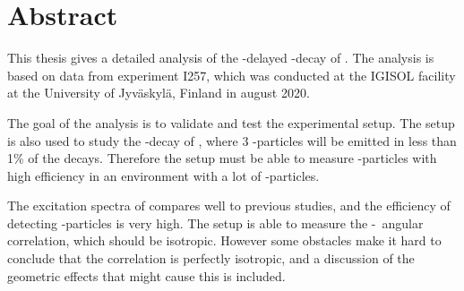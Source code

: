 \chapter*{Abstract}
This thesis gives a detailed analysis of the \be-delayed \al-decay of \li. The analysis is based on data from experiment I257, which was conducted at the IGISOL facility at the University of Jyväskylä, Finland in august 2020. 

The goal of the analysis is to validate and test the experimental setup. The setup is also used to study the \be-decay of , where 3 \al-particles will be emitted in less than 1\% of the decays.
Therefore the setup must be able to measure \al-particles with high efficiency in an environment with a lot of \be-particles. 

The excitation spectra of \ber compares well to previous studies, and the efficiency of detecting \al-particles is very high.
The setup is able to measure the \be-\al\ angular correlation, which should be isotropic. However some obstacles make it hard to conclude that the correlation is perfectly isotropic, and a discussion of the geometric effects that might cause this is included. 